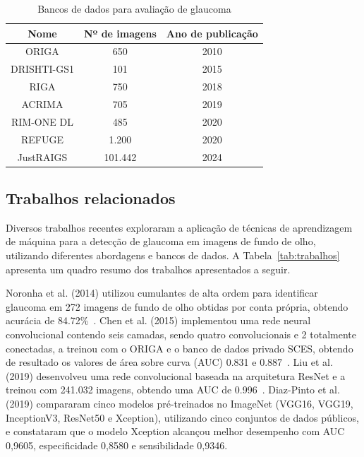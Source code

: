\documentclass[12pt]{article}
\begin{document}
\begin{table}[htb]
    \centering
    \begin{tabular}{|c|c|c|}
    \hline
    Nome & Nº de imagens & Ano de publicação \\
    \hline
    ORIGA & 650 & 2010 \\
    \hline
    DRISHTI-GS1 & 101 & 2015 \\
    \hline
    RIGA & 750 & 2018 \\
    \hline
    ACRIMA & 705 & 2019 \\
    \hline
    RIM-ONE DL & 485 & 2020 \\
    \hline
    REFUGE & 1.200 & 2020 \\
    \hline
    JustRAIGS & 101.442 & 2024 \\
    \hline
    \end{tabular}
    \caption{Bancos de dados para avaliação de glaucoma}
    \label{tab:datasets}
\end{table}

\subsection{Trabalhos relacionados}
\label{sec:review:related}

Diversos trabalhos recentes exploraram a aplicação de técnicas de aprendizagem de máquina para a detecção de glaucoma em imagens de fundo de olho, utilizando diferentes abordagens e bancos de dados. A Tabela~\ref{tab:trabalhos} apresenta um quadro resumo dos trabalhos apresentados a seguir.

Noronha et al. (2014) utilizou cumulantes de alta ordem para identificar glaucoma em 272 imagens de fundo de olho obtidas por conta própria, obtendo acurácia de 84.72\%~\cite{noronha2014hoc}. Chen et al. (2015) implementou uma rede neural convolucional contendo seis camadas, sendo quatro convolucionais e 2 totalmente conectadas, a treinou com o ORIGA e o banco de dados privado SCES, obtendo de resultado os valores de área sobre curva (AUC) 0.831 e 0.887~\cite{chen2015cnn}. Liu et al. (2019) desenvolveu uma rede convolucional baseada na arquitetura ResNet e a treinou com 241.032 imagens, obtendo uma AUC de 0.996~\cite{liu_cnn_2019}. Diaz-Pinto et al. (2019) compararam cinco modelos pré-treinados no ImageNet (VGG16, VGG19, InceptionV3, ResNet50 e Xception), utilizando cinco conjuntos de dados públicos, e constataram que o modelo Xception alcançou melhor desempenho com AUC 0,9605, especificidade 0,8580 e sensibilidade 0,9346.
\end{document}

